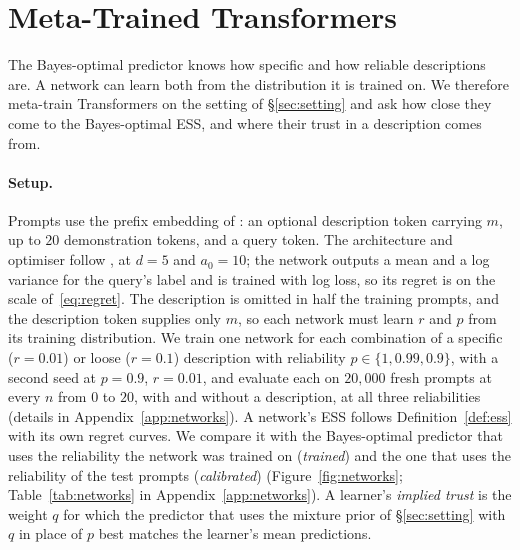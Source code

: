 \documentclass{article}
\begin{document}
\section{Meta-Trained Transformers}\label{sec:networks}
The Bayes-optimal predictor knows how specific and how reliable descriptions are. A network can learn both from the distribution it is trained on. We therefore meta-train Transformers on the setting of \S\ref{sec:setting} and ask how close they come to the Bayes-optimal ESS, and where their trust in a description comes from.

\paragraph{Setup.} Prompts use the prefix embedding of \citet{huangge2025}: an optional description token carrying $m$, up to $20$ demonstration tokens, and a query token. The architecture and optimiser follow \citet{garg2022}, at $d = 5$ and $a_0 = 10$; the network outputs a mean and a log variance for the query's label and is trained with log loss, so its regret is on the scale of~\eqref{eq:regret}. The description is omitted in half the training prompts, and the description token supplies only $m$, so each network must learn $r$ and $p$ from its training distribution. We train one network for each combination of a specific ($r = 0.01$) or loose ($r = 0.1$) description with reliability $p \in \{1, 0.99, 0.9\}$, with a second seed at $p = 0.9$, $r = 0.01$, and evaluate each on $20{,}000$ fresh prompts at every $n$ from $0$ to $20$, with and without a description, at all three reliabilities (details in Appendix~\ref{app:networks}). A network's ESS follows Definition~\ref{def:ess} with its own regret curves. We compare it with the Bayes-optimal predictor that uses the reliability the network was trained on (\emph{trained}) and the one that uses the reliability of the test prompts (\emph{calibrated}) (Figure~\ref{fig:networks}; Table~\ref{tab:networks} in Appendix~\ref{app:networks}). A learner's \emph{implied trust} is the weight $q$ for which the predictor that uses the mixture prior of \S\ref{sec:setting} with $q$ in place of $p$ best matches the learner's mean predictions.
\end{document}

